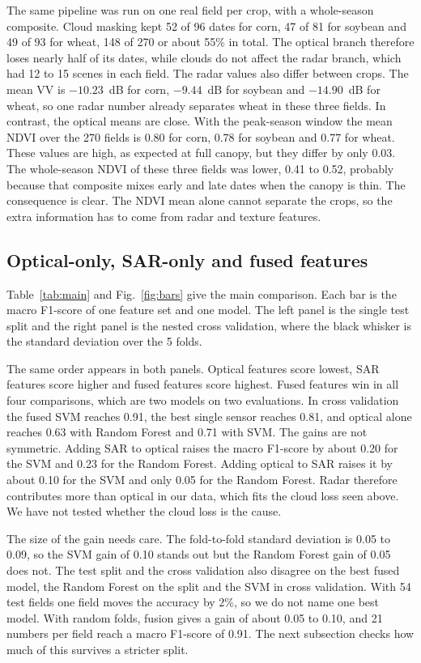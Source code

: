 \documentclass[conference]{IEEEtran}
\begin{document}
The same pipeline was run on one real field per crop, with a whole-season composite. Cloud masking kept 52 of 96 dates for corn, 47 of 81 for soybean and 49 of 93 for wheat, 148 of 270 or about 55\% in total. The optical branch therefore loses nearly half of its dates, while clouds do not affect the radar branch, which had 12 to 15 scenes in each field. The radar values also differ between crops. The mean VV is $-10.23$~dB for corn, $-9.44$~dB for soybean and $-14.90$~dB for wheat, so one radar number already separates wheat in these three fields. In contrast, the optical means are close. With the peak-season window the mean NDVI over the 270 fields is 0.80 for corn, 0.78 for soybean and 0.77 for wheat. These values are high, as expected at full canopy, but they differ by only 0.03. The whole-season NDVI of these three fields was lower, 0.41 to 0.52, probably because that composite mixes early and late dates when the canopy is thin. The consequence is clear. The NDVI mean alone cannot separate the crops, so the extra information has to come from radar and texture features.

\subsection{Optical-only, SAR-only and fused features}
Table~\ref{tab:main} and Fig.~\ref{fig:bars} give the main comparison. Each bar is the macro F1-score of one feature set and one model. The left panel is the single test split and the right panel is the nested cross validation, where the black whisker is the standard deviation over the 5 folds.

The same order appears in both panels. Optical features score lowest, SAR features score higher and fused features score highest. Fused features win in all four comparisons, which are two models on two evaluations. In cross validation the fused SVM reaches 0.91, the best single sensor reaches 0.81, and optical alone reaches 0.63 with Random Forest and 0.71 with SVM. The gains are not symmetric. Adding SAR to optical raises the macro F1-score by about 0.20 for the SVM and 0.23 for the Random Forest. Adding optical to SAR raises it by about 0.10 for the SVM and only 0.05 for the Random Forest. Radar therefore contributes more than optical in our data, which fits the cloud loss seen above. We have not tested whether the cloud loss is the cause.

The size of the gain needs care. The fold-to-fold standard deviation is 0.05 to 0.09, so the SVM gain of 0.10 stands out but the Random Forest gain of 0.05 does not. The test split and the cross validation also disagree on the best fused model, the Random Forest on the split and the SVM in cross validation. With 54 test fields one field moves the accuracy by 2\%, so we do not name one best model. With random folds, fusion gives a gain of about 0.05 to 0.10, and 21 numbers per field reach a macro F1-score of 0.91. The next subsection checks how much of this survives a stricter split.
\end{document}
